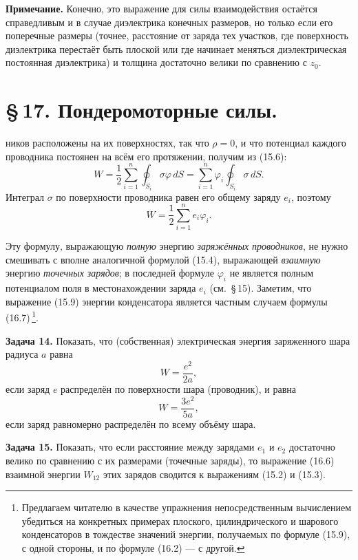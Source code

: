 \documentclass[a4paper,12pt]{article}
\begin{document}
\textbf{Примечание.} Конечно, это выражение для силы взаимодействия
остаётся справедливым и в случае диэлектрика конечных размеров, но
только если его поперечные размеры (точнее, расстояние от заряда тех
участков, где поверхность диэлектрика перестаёт быть плоской или где
начинает меняться диэлектрическая постоянная диэлектрика) и толщина
достаточно велики по сравнению с $z_0$.


\section*{\S\,17. Пондеромоторные силы.}


ников расположены на их поверхностях, так что $\rho = 0$, и что
потенциал каждого проводника постоянен на всём его протяжении,
получим из (15.6):
$$
    W = \frac{1}{2}\sum_{i=1}^n\oint_{S_i}\sigma\varphi\,dS
      = \sum_{i=1}^n\varphi_i\oint_{S_i}\sigma\,dS.
$$
Интеграл $\sigma$ по поверхности проводника равен его общему заряду
$e_i$, поэтому
\begin{equation}
    W = \frac{1}{2}\sum_{i=1}^n e_i\varphi_i.
    \tag{16.7}
\end{equation}

Эту формулу, выражающую \textit{полную} энергию \textit{заряжённых
проводников}, не нужно смешивать с вполне аналогичной формулой (15.4),
выражающей \textit{взаимную} энергию \textit{точечных зарядов}; в
последней формуле $\varphi_i$ не является полным потенциалом поля
в местонахождении заряда $e_i$ (см.\ §\,15). Заметим, что выражение
(15.9) энергии конденсатора является частным случаем формулы (16.7)\,\footnote{Предлагаем
читателю в качестве упражнения непосредственным вычислением убедиться
на конкретных примерах плоского, цилиндрического и шарового конденсаторов
в тождестве значений энергии, получаемых по формуле (15.9), с одной
стороны, и по формуле (16.2) — с другой.}.

\textbf{Задача 14.} Показать, что (собственная) электрическая энергия
заряженного шара радиуса $a$ равна
$$
    W = \frac{e^2}{2a},
$$
если заряд $e$ распределён по поверхности шара (проводник), и равна
$$
    W = \frac{3e^2}{5a},
$$
если заряд равномерно распределён по всему объёму шара.

\textbf{Задача 15.} Показать, что если расстояние между зарядами $e_1$
и $e_2$ достаточно велико по сравнению с их размерами (точечные заряды),
то выражение (16.6) взаимной энергии $W_{12}$ этих зарядов сводится
к выражениям (15.2) и (15.3).
\end{document}
